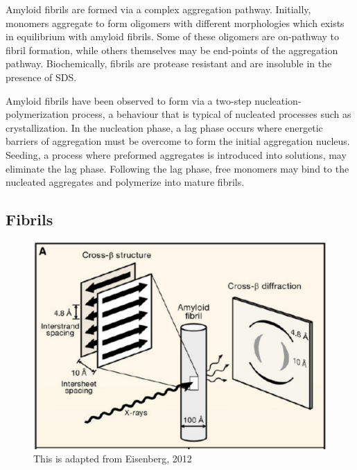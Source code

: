 Amyloid fibrils are formed via a complex aggregation pathway. Initially, monomers aggregate to form oligomers with different morphologies which exists in equilibrium with amyloid fibrils. Some of these oligomers are on-pathway to fibril formation, while others themselves may be end-points of the aggregation pathway. Biochemically, fibrils are protease resistant and are insoluble in the presence of SDS.



Amyloid fibrils have been observed to form via a two-step nucleation-polymerization process, a behaviour that is typical of nucleated processes such as crystallization.  In the nucleation phase, a lag phase occurs where energetic barriers of aggregation must be overcome to form the initial aggregation nucleus. Seeding, a process where preformed aggregates is introduced into solutions, may eliminate the lag phase.  Following the lag phase, free monomers may bind to the nucleated aggregates and polymerize into mature fibrils.\cite{Murphy:2002fe} 


\subsection{Fibrils}

\begin{figure}
  \centering
  \includegraphics[width=6in]{figures/introduction/fibril_structure_diffraction.pdf}
  \caption[Characteristic cross-$\beta$ spacings from X-ray fibre diffraction studies of amyloid fibrils]{This is adapted from Eisenberg, 2012}
  \label{fig:fibril_diffraction}
\end{figure}

